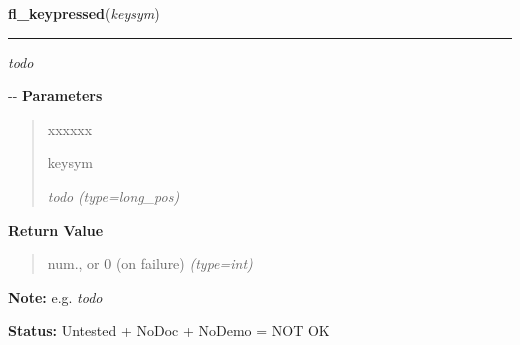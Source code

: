 \hspace{.8\funcindent}\begin{boxedminipage}{\funcwidth}

    \raggedright \textbf{fl\_keypressed}(\textit{keysym})

    \vspace{-1.5ex}

    \rule{\textwidth}{0.5\fboxrule}
\setlength{\parskip}{2ex}

\emph{todo}

-{}-
\setlength{\parskip}{1ex}
      \textbf{Parameters}
      \vspace{-1ex}

      \begin{quote}
        \begin{Ventry}{xxxxxx}

          \item[keysym]


\emph{todo}
            {\it (type=long\_pos)}

        \end{Ventry}

      \end{quote}

      \textbf{Return Value}
    \vspace{-1ex}

      \begin{quote}

num., or 0 (on failure)
      {\it (type=int)}

      \end{quote}

\textbf{Note:} 
e.g. \emph{todo}


\textbf{Status:} 
Untested + NoDoc + NoDemo = NOT OK


    \end{boxedminipage}

    \label{xformslib:flxbasic:fl_set_defaults}

    \vspace{0.5ex}

